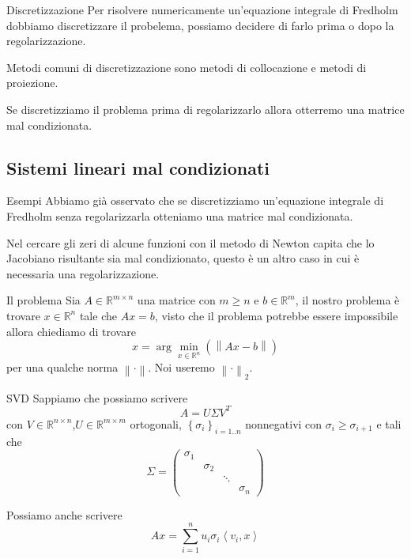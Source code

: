 \documentclass{beamer}
\theoremstyle{plain}
\theoremstyle{definition}
\theoremstyle{remark}
\newcommand{\set}[1]{\left\{#1\right\}}
\newcommand{\pa}[1]{\left(#1\right)}
\newcommand{\ang}[1]{\left<#1\right>}
\newcommand{\norm}[1]{\left\|#1\right\|}
\begin{document}
\begin{frame}{Discretizzazione}
  Per risolvere numericamente un'equazione integrale di Fredholm
  dobbiamo discretizzare il probelema, possiamo decidere di farlo
  prima o dopo la regolarizzazione.
  \vfill
  
  Metodi comuni di discretizzazione sono metodi di collocazione e
  metodi di proiezione.
  \vfill
  
  Se discretizziamo il problema prima di regolarizzarlo allora
  otterremo una matrice mal condizionata.
\end{frame}



\subsection{Sistemi lineari mal condizionati}

\begin{frame}{Esempi}
  Abbiamo già osservato che se discretizziamo un'equazione integrale di
  Fredholm senza regolarizzarla otteniamo una matrice mal
  condizionata.
  \vfill
  
  Nel cercare gli zeri di alcune funzioni con il metodo di Newton
  capita che lo Jacobiano risultante sia mal condizionato, questo è un
  altro caso in cui è necessaria una regolarizzazione.
\end{frame}

\begin{frame}{Il problema}
  Sia $A\in \mathbb{R}^{m \times n}$ una matrice con $m \ge n$ e $b
  \in \mathbb{R}^m$, il nostro problema è trovare $x \in \mathbb{R}^n$
  tale che $Ax = b$, visto che il problema potrebbe essere impossibile
  allora chiediamo di trovare
  \[ x = \arg\min _{x\in \mathbb{R}^n} \pa{ \norm{Ax -b} } \]
  per una qualche norma $\norm{\cdot}$. Noi useremo $\norm{\cdot}_2$.
\end{frame}

\begin{frame}{SVD}
  Sappiamo che possiamo scrivere
  \[ A = U\Sigma V^T \] 
  con $V\in \mathbb{R}^{n\times n}$,$U\in \mathbb{R}^{m\times m}$
  ortogonali, $\set{\sigma _i}_{i=1..n}$ nonnegativi con $\sigma _i
  \ge \sigma _{i+1}$ e tali che
  \[ \Sigma = \begin{pmatrix}
    \sigma _1 & & & \\
    & \sigma _2 & &  \\
    & & \ddots & \\
    & & & \sigma _n 
  \end{pmatrix} \]
  
  Possiamo anche scrivere
  \[ Ax = \sum _{i=1} ^n u_i \sigma _i \ang{v_i,x} \]
\end{frame}
\end{document}
